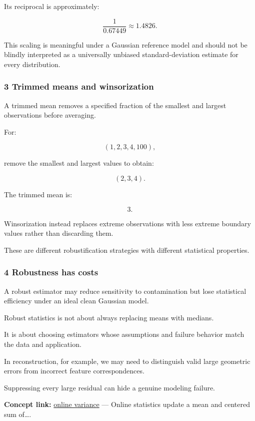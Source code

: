 Its reciprocal is approximately:

\[
 \frac1{0.67449}\approx1.4826.
\]

This scaling is meaningful under a Gaussian reference model and should not be blindly interpreted as a universally unbiased standard-deviation estimate for every distribution.

\subsubsection{3 Trimmed means and winsorization}\label{02-foundations-ii-ch030-trimmed-means-and-winsorization}

A trimmed mean removes a specified fraction of the smallest and largest observations before averaging.

For:

\[
 (1,2,3,4,100),
\]

remove the smallest and largest values to obtain:

\[
 (2,3,4).
\]

The trimmed mean is:

\[
 \boxed{3}.
\]

Winsorization instead replaces extreme observations with less extreme boundary values rather than discarding them.

These are different robustification strategies with different statistical properties.

\subsubsection{4 Robustness has costs}\label{02-foundations-ii-ch030-robustness-has-costs}

A robust estimator may reduce sensitivity to contamination but lose statistical efficiency under an ideal clean Gaussian model.

Robust statistics is not about always replacing means with medians.

It is about choosing estimators whose assumptions and failure behavior match the data and application.

In reconstruction, for example, we may need to distinguish valid large geometric errors from incorrect feature correspondences.

Suppressing every large residual can hide a genuine modeling failure.

\textbf{Concept link:} \hyperref[02-foundations-ii-ch030-finite-samples-need-stable-descriptive-statistics]{online variance} --- Online statistics update a mean and centered sum of\ldots.

